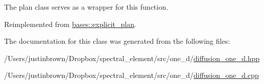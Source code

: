  

 

 The plan class serves as a wrapper for this function. 

Reimplemented from \hyperlink{classbases_1_1explicit__plan_a21bcba4d429590031bba41ee2a48a4ef}{bases\-::explicit\-\_\-plan}.



The documentation for this class was generated from the following files\-:\begin{DoxyCompactItemize}
\item 
/\-Users/justinbrown/\-Dropbox/spectral\-\_\-element/src/one\-\_\-d/\hyperlink{diffusion__one__d_8hpp}{diffusion\-\_\-one\-\_\-d.\-hpp}\item 
/\-Users/justinbrown/\-Dropbox/spectral\-\_\-element/src/one\-\_\-d/\hyperlink{diffusion__one__d_8cpp}{diffusion\-\_\-one\-\_\-d.\-cpp}\end{DoxyCompactItemize}
